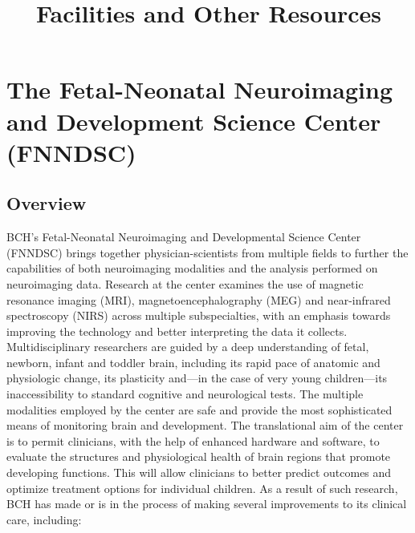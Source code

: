 \documentclass[11pt]{amsart}
\title{Facilities and Other Resources}
\author{}
\date{}
\begin{document}
\maketitle
\hypertarget{x-the-fetal-neonatal-neuroimaging-and-development-science-center-(fnndsc)}{\section*{The Fetal-Neonatal Neuroimaging and Development Science Center (FNNDSC)}}
\hypertarget{x-overview}{\subsection*{Overview}}
BCH’s Fetal-Neonatal Neuroimaging and Developmental Science Center (FNNDSC) brings together physician-scientists from multiple fields to further the capabilities of both neuroimaging modalities and the analysis performed on neuroimaging data. Research at the center examines the use of magnetic resonance imaging (MRI), magnetoencephalography (MEG) and near-infrared spectroscopy (NIRS) across multiple subspecialties, with an emphasis towards improving the technology and better interpreting the data it collects. Multidisciplinary researchers are guided by a deep understanding of fetal, newborn, infant and toddler brain, including its rapid pace of anatomic and physiologic change, its plasticity and—in the case of very young children—its inaccessibility to standard cognitive and neurological tests. The multiple modalities employed by the center are safe and provide the most sophisticated means of monitoring brain and development. The translational aim of the center is to permit clinicians, with the help of enhanced hardware and software, to evaluate the structures and physiological health of brain regions that promote developing functions. This will allow clinicians to better predict outcomes and optimize treatment options for individual children. As a result of such research, BCH has made or is in the process of making several improvements to its clinical
care, including:
\end{document}
